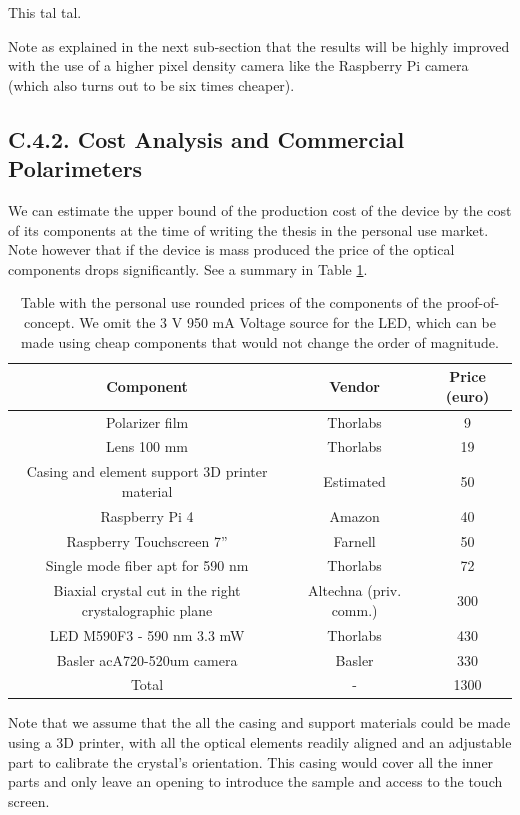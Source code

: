 \documentclass[11pt, a4paper, twoside]{article} %
\begin{document}
This tal tal.

Note as explained in the next sub-section that the results will be highly improved with the use of a higher pixel density camera like the Raspberry Pi camera (which also turns out to be six times cheaper).

\subsection*{C.4.2. Cost Analysis and Commercial Polarimeters}
We can estimate the upper bound of the production cost of the device by the cost of its components at the time of writing the thesis in the personal use market. Note however that if the device is mass produced the price of the optical components drops significantly. See a summary in Table \ref{tab:prices}.


\begin{table}[h!]
\caption{Table with the personal use rounded prices of the components of the proof-of-concept. We omit the 3 V 950 mA Voltage source for the LED, which can be made using cheap components that would not change the order of magnitude. }
\centering
\label{tab:prices}
\begin{tabular}{c|c|c}
\toprule
    {\bf Component}& {\bf Vendor } & {\bf Price (euro) } \\
\hline
Polarizer film & Thorlabs & 9\\
Lens 100 mm & Thorlabs & 19\\
Casing and element support 3D printer material & Estimated & 50 \\
Raspberry Pi 4 & Amazon & 40\\
Raspberry Touchscreen 7'' & Farnell & 50\\
Single mode fiber apt for 590 nm & Thorlabs & 72 \\
Biaxial crystal cut in the right crystalographic plane & Altechna (priv. comm.) & 300 \\
LED M590F3 - 590 nm 3.3 mW & Thorlabs & 430\\
Basler acA720-520um camera & Basler & 330\\
\hline
Total & - & 1300 \\
\bottomrule
\end{tabular}
\end{table}

Note that we assume that the all the casing and support materials could be made using a 3D printer, with all the optical elements readily aligned and an adjustable part to calibrate the crystal's orientation. This casing would cover all the inner parts and only leave an opening to introduce the sample and access to the touch screen.
\end{document}
